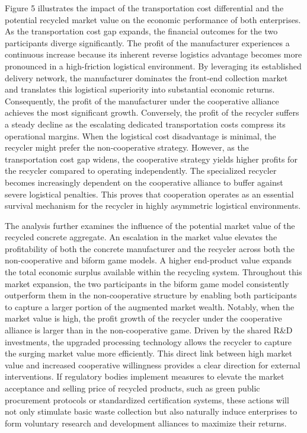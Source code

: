 \documentclass[authoryear,preprint,review,times,10pt]{elsarticle}
\begin{document}
Figure 5 illustrates the impact of the transportation cost differential and the potential recycled market value on the economic performance of both enterprises. As the transportation cost gap expands, the financial outcomes for the two participants diverge significantly. The profit of the manufacturer experiences a continuous increase because its inherent reverse logistics advantage becomes more pronounced in a high-friction logistical environment. By leveraging its established delivery network, the manufacturer dominates the front-end collection market and translates this logistical superiority into substantial economic returns. Consequently, the profit of the manufacturer under the cooperative alliance achieves the most significant growth. Conversely, the profit of the recycler suffers a steady decline as the escalating dedicated transportation costs compress its operational margins. When the logistical cost disadvantage is minimal, the recycler might prefer the non-cooperative strategy. However, as the transportation cost gap widens, the cooperative strategy yields higher profits for the recycler compared to operating independently. The specialized recycler becomes increasingly dependent on the cooperative alliance to buffer against severe logistical penalties. This proves that cooperation operates as an essential survival mechanism for the recycler in highly asymmetric logistical environments.

The analysis further examines the influence of the potential market value of the recycled concrete aggregate. An escalation in the market value elevates the profitability of both the concrete manufacturer and the recycler across both the non-cooperative and biform game models. A higher end-product value expands the total economic surplus available within the recycling system. Throughout this market expansion, the two participants in the biform game model consistently outperform them in the non-cooperative structure by enabling both participants to capture a larger portion of the augmented market wealth. Notably, when the market value is high, the profit growth of the recycler under the cooperative alliance is larger than in the non-cooperative game. Driven by the shared R\&D investments, the upgraded processing technology allows the recycler to capture the surging market value more efficiently. This direct link between high market value and increased cooperative willingness provides a clear direction for external interventions. If regulatory bodies implement measures to elevate the market acceptance and selling price of recycled products, such as green public procurement protocols or standardized certification systems, these actions will not only stimulate basic waste collection but also naturally induce enterprises to form voluntary research and development alliances to maximize their returns.
\end{document}
